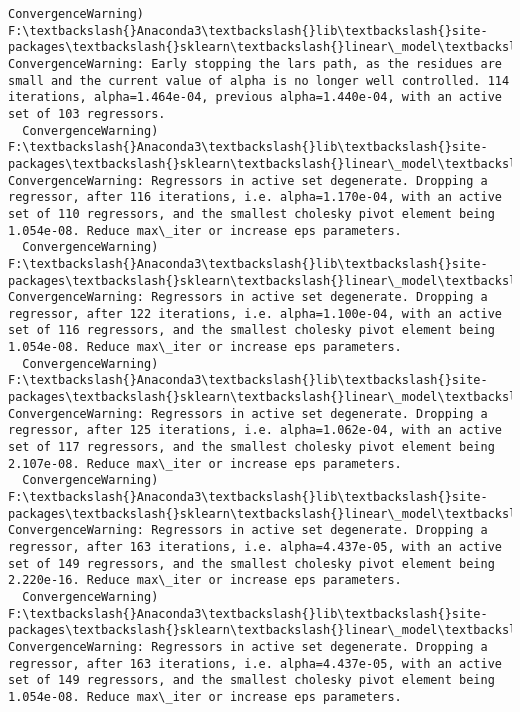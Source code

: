 \documentclass[11pt]{article}
\begin{document}
\begin{Verbatim}[commandchars=\\\{\}]
  ConvergenceWarning)
F:\textbackslash{}Anaconda3\textbackslash{}lib\textbackslash{}site-packages\textbackslash{}sklearn\textbackslash{}linear\_model\textbackslash{}least\_angle.py:339: ConvergenceWarning: Early stopping the lars path, as the residues are small and the current value of alpha is no longer well controlled. 114 iterations, alpha=1.464e-04, previous alpha=1.440e-04, with an active set of 103 regressors.
  ConvergenceWarning)
F:\textbackslash{}Anaconda3\textbackslash{}lib\textbackslash{}site-packages\textbackslash{}sklearn\textbackslash{}linear\_model\textbackslash{}least\_angle.py:313: ConvergenceWarning: Regressors in active set degenerate. Dropping a regressor, after 116 iterations, i.e. alpha=1.170e-04, with an active set of 110 regressors, and the smallest cholesky pivot element being 1.054e-08. Reduce max\_iter or increase eps parameters.
  ConvergenceWarning)
F:\textbackslash{}Anaconda3\textbackslash{}lib\textbackslash{}site-packages\textbackslash{}sklearn\textbackslash{}linear\_model\textbackslash{}least\_angle.py:313: ConvergenceWarning: Regressors in active set degenerate. Dropping a regressor, after 122 iterations, i.e. alpha=1.100e-04, with an active set of 116 regressors, and the smallest cholesky pivot element being 1.054e-08. Reduce max\_iter or increase eps parameters.
  ConvergenceWarning)
F:\textbackslash{}Anaconda3\textbackslash{}lib\textbackslash{}site-packages\textbackslash{}sklearn\textbackslash{}linear\_model\textbackslash{}least\_angle.py:313: ConvergenceWarning: Regressors in active set degenerate. Dropping a regressor, after 125 iterations, i.e. alpha=1.062e-04, with an active set of 117 regressors, and the smallest cholesky pivot element being 2.107e-08. Reduce max\_iter or increase eps parameters.
  ConvergenceWarning)
F:\textbackslash{}Anaconda3\textbackslash{}lib\textbackslash{}site-packages\textbackslash{}sklearn\textbackslash{}linear\_model\textbackslash{}least\_angle.py:313: ConvergenceWarning: Regressors in active set degenerate. Dropping a regressor, after 163 iterations, i.e. alpha=4.437e-05, with an active set of 149 regressors, and the smallest cholesky pivot element being 2.220e-16. Reduce max\_iter or increase eps parameters.
  ConvergenceWarning)
F:\textbackslash{}Anaconda3\textbackslash{}lib\textbackslash{}site-packages\textbackslash{}sklearn\textbackslash{}linear\_model\textbackslash{}least\_angle.py:313: ConvergenceWarning: Regressors in active set degenerate. Dropping a regressor, after 163 iterations, i.e. alpha=4.437e-05, with an active set of 149 regressors, and the smallest cholesky pivot element being 1.054e-08. Reduce max\_iter or increase eps parameters.

\end{Verbatim}
\end{document}

